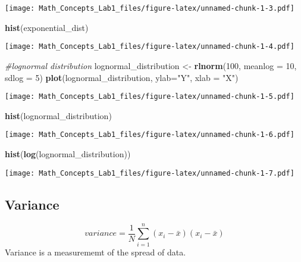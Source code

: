 \documentclass[11pt,]{article}
\newenvironment{Shaded}{\begin{snugshade}}{\end{snugshade}}
\newcommand{\KeywordTok}[1]{\textcolor[rgb]{0.13,0.29,0.53}{\textbf{#1}}}
\newcommand{\DataTypeTok}[1]{\textcolor[rgb]{0.13,0.29,0.53}{#1}}
\newcommand{\DecValTok}[1]{\textcolor[rgb]{0.00,0.00,0.81}{#1}}
\newcommand{\StringTok}[1]{\textcolor[rgb]{0.31,0.60,0.02}{#1}}
\newcommand{\CommentTok}[1]{\textcolor[rgb]{0.56,0.35,0.01}{\textit{#1}}}
\newcommand{\NormalTok}[1]{#1}
\begin{document}
\texttt{[image: Math\_Concepts\_Lab1\_files/figure-latex/unnamed-chunk-1-3.pdf]}

\begin{Shaded}
\begin{Highlighting}[]
\KeywordTok{hist}\NormalTok{(exponential_dist)}
\end{Highlighting}
\end{Shaded}

\texttt{[image: Math\_Concepts\_Lab1\_files/figure-latex/unnamed-chunk-1-4.pdf]}

\begin{Shaded}
\begin{Highlighting}[]
\CommentTok{#lognormal distribution}
\NormalTok{lognormal_distribution <-}\StringTok{ }\KeywordTok{rlnorm}\NormalTok{(}\DecValTok{100}\NormalTok{, }\DataTypeTok{meanlog =} \DecValTok{10}\NormalTok{, }\DataTypeTok{sdlog =} \DecValTok{5}\NormalTok{)}
\KeywordTok{plot}\NormalTok{(lognormal_distribution,  }\DataTypeTok{ylab=}\StringTok{"Y"}\NormalTok{, }\DataTypeTok{xlab =} \StringTok{"X"}\NormalTok{)}
\end{Highlighting}
\end{Shaded}

\texttt{[image: Math\_Concepts\_Lab1\_files/figure-latex/unnamed-chunk-1-5.pdf]}

\begin{Shaded}
\begin{Highlighting}[]
\KeywordTok{hist}\NormalTok{(lognormal_distribution)}
\end{Highlighting}
\end{Shaded}

\texttt{[image: Math\_Concepts\_Lab1\_files/figure-latex/unnamed-chunk-1-6.pdf]}

\begin{Shaded}
\begin{Highlighting}[]
\KeywordTok{hist}\NormalTok{(}\KeywordTok{log}\NormalTok{(lognormal_distribution))}
\end{Highlighting}
\end{Shaded}

\texttt{[image: Math\_Concepts\_Lab1\_files/figure-latex/unnamed-chunk-1-7.pdf]}

\subsection{Variance}\label{variance}

\[variance=\frac{1}{N}\sum_{i=1}^{n}(x_i - \bar{x})(x_i - \bar{x})\]
Variance is a measurememt of the spread of data.
\end{document}
